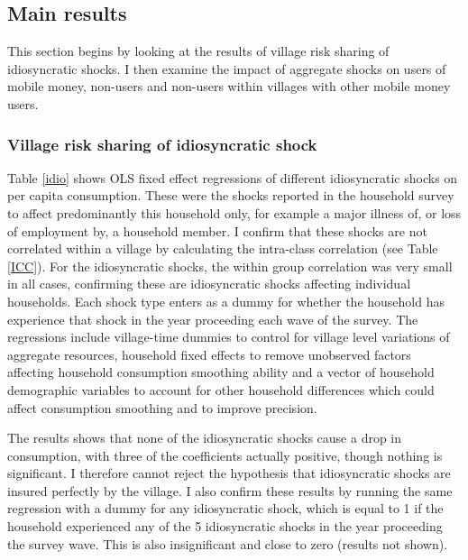 \subsection{Main results}
This section begins by looking at the results of village risk sharing of idiosyncratic shocks. I then examine the impact of aggregate shocks on users of mobile money, non-users and non-users within villages with other mobile money users.  

\subsubsection{Village risk sharing of idiosyncratic shock}
Table \ref{idio} shows OLS fixed effect regressions of different idiosyncratic shocks on per capita consumption. These were the shocks reported in the household survey to affect predominantly this household only, for example a major illness of, or loss of employment by, a household member. I confirm that these shocks are not correlated within a village by calculating the intra-class correlation (see Table \ref{ICC}). For the idiosyncratic shocks, the within group correlation was very small in all cases, confirming these are idiosyncratic shocks affecting individual households.     
Each shock type enters as a dummy for whether the household has experience that shock in the year proceeding each wave of the survey. The regressions include village-time dummies to control for village level variations of aggregate resources, household fixed effects to remove unobserved factors affecting household consumption smoothing ability and a vector of household demographic variables to account for other household differences which could affect consumption smoothing and to improve precision. 

The results shows that none of the idiosyncratic shocks cause a drop in consumption, with three of the coefficients actually positive, though nothing is significant. I therefore cannot reject the hypothesis that idiosyncratic shocks are insured perfectly by the village. I also confirm these results by running the same regression with a dummy for any idiosyncratic shock, which is equal to 1 if the household experienced any of the 5 idiosyncratic shocks in the year proceeding the survey wave. This is also insignificant and close to zero (results not shown).  



